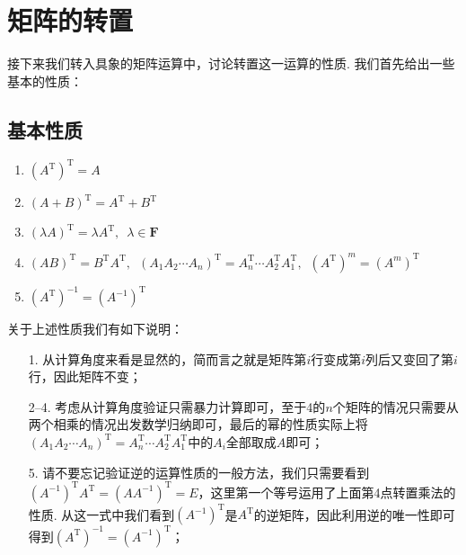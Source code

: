 \section{矩阵的转置}

接下来我们转入具象的矩阵运算中，讨论转置这一运算的性质. 我们首先给出一些基本的性质：

\subsection{基本性质}

\begin{enumerate}
    \item $(A^\mathrm{T})^\mathrm{T}=A$

    \item $(A+B)^\mathrm{T}=A^\mathrm{T}+B^\mathrm{T}$

    \item $(\lambda A)^\mathrm{T}=\lambda A^\mathrm{T},\enspace \lambda \in \mathbf{F}$

    \item $(AB)^\mathrm{T}=B^\mathrm{T}A^\mathrm{T},\enspace(A_1A_2\cdots A_n)^\mathrm{T}=A_n^\mathrm{T}\cdots A_2^\mathrm{T}A_1^\mathrm{T},\enspace(A^\mathrm{T})^m=(A^m)^\mathrm{T}$

    \item $(A^\mathrm{T})^{-1}=(A^{-1})^\mathrm{T}$
\end{enumerate}
关于上述性质我们有如下说明：
\begin{itemize}
    \item[1.] 从计算角度来看是显然的，简而言之就是矩阵第$i$行变成第$i$列后又变回了第$i$行，因此矩阵不变；

    \item[2--4.] 考虑从计算角度验证只需暴力计算即可，至于4的$n$个矩阵的情况只需要从两个相乘的情况出发数学归纳即可，最后的幂的性质实际上将$(A_1A_2\cdots A_n)^\mathrm{T}=A_n^\mathrm{T}\cdots A_2^\mathrm{T}A_1^\mathrm{T}$中的$A_i$全部取成$A$即可；

    \item[5.] 请不要忘记验证逆的运算性质的一般方法，我们只需要看到$(A^{-1})^\mathrm{T}A^\mathrm{T}=(AA^{-1})^\mathrm{T}=E$，这里第一个等号运用了上面第4点转置乘法的性质. 从这一式中我们看到$(A^{-1})^\mathrm{T}$是$A^\mathrm{T}$的逆矩阵，因此利用逆的唯一性即可得到$(A^\mathrm{T})^{-1}=(A^{-1})^\mathrm{T}$；
\end{itemize}

